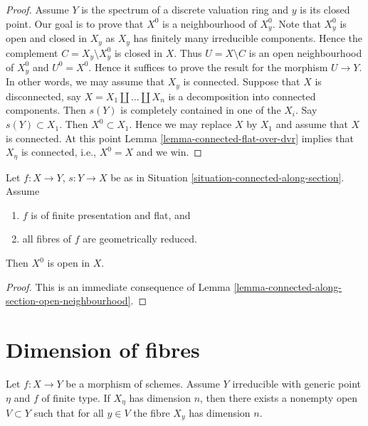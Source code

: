 \begin{proof}
\medskip\noindent
Assume $Y$ is the spectrum of a discrete valuation ring and $y$ is its closed
point. Our goal is to prove that $X^0$ is a neighbourhood of $X^0_y$.
Note that $X^0_y$ is open and closed in $X_y$ as $X_y$ has finitely
many irreducible components. Hence the complement $C = X_y \setminus X_y^0$
is closed in $X$. Thus $U = X \setminus C$ is an open neighbourhood of
$X^0_y$ and $U^0 = X^0$. Hence it suffices to prove the result for the
morphism $U \to Y$. In other words, we may assume that
$X_y$ is connected. Suppose that $X$ is disconnected, say
$X = X_1 \amalg \ldots \amalg X_n$ is a decomposition into connected
components. Then $s(Y)$ is completely contained in one of the $X_i$.
Say $s(Y) \subset X_1$. Then $X^0 \subset X_1$. Hence we may replace
$X$ by $X_1$ and assume that $X$ is connected. At this point
Lemma \ref{lemma-connected-flat-over-dvr}
implies that $X_\eta$ is connected, i.e., $X^0 = X$ and we win.
\end{proof}

\begin{lemma}
\label{lemma-connected-along-section-open}
Let $f : X \to Y$, $s : Y \to X$ be as in
Situation \ref{situation-connected-along-section}.
Assume
\begin{enumerate}
\item $f$ is of finite presentation and flat, and
\item all fibres of $f$ are geometrically reduced.
\end{enumerate}
Then $X^0$ is open in $X$.
\end{lemma}

\begin{proof}
This is an immediate consequence of
Lemma \ref{lemma-connected-along-section-open-neighbourhood}.
\end{proof}






\section{Dimension of fibres}
\label{section-dimension}

\begin{lemma}
\label{lemma-dimension-in-neighbourhood}
Let $f : X \to Y$ be a morphism of schemes. Assume $Y$ irreducible with
generic point $\eta$ and $f$ of finite type. If $X_\eta$ has dimension $n$,
then there exists a nonempty open $V \subset Y$
such that for all $y \in V$ the fibre $X_y$ has dimension $n$.
\end{lemma}

